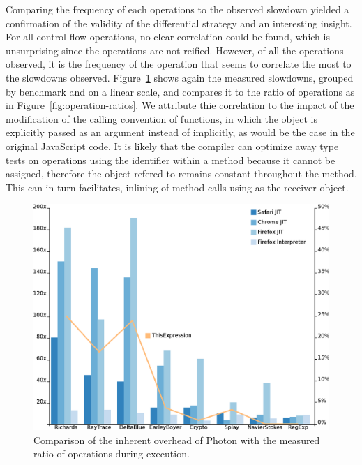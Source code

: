 Comparing the frequency of each operations to the observed slowdown yielded a
confirmation of the validity of the differential strategy and an interesting
insight. For all control-flow operations, no clear correlation could be found,
which is unsurprising since the operations are not reified. However, of all the
operations observed, it is the frequency of the  operation that seems
to correlate the most to the slowdowns observed.
Figure~\ref{fig:slowdown-vs-this-ratio} shows again the measured slowdowns,
grouped by benchmark and on a linear scale, and compares it to the ratio of
 operations as in Figure~\ref{fig:operation-ratios}.  We attribute
thie correlation to the impact of the modification of the calling convention of
functions, in which the  object is explicitly passed as an argument
instead of implicitly, as would be the case in the original JavaScript code. It
is likely that the compiler can optimize away type tests on operations using
the  identifier within a method because it cannot be assigned,
therefore the object refered to remains constant throughout the method. This
can in turn facilitates, inlining of method calls using  as the
receiver object.

\begin{figure}[htbp]
\begin{center}
\includegraphics[width=.80\textwidth]{figures/slowdownVSThisRatio}
\caption[Slowdown vs Ratio of this operations]{Comparison of the inherent overhead of Photon with the measured ratio of  operations during execution.}
\label{fig:slowdown-vs-this-ratio}
\end{center}
\end{figure}

\FloatBarrier

